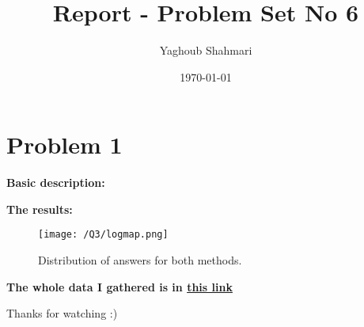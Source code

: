 \documentclass{article}
\author{Yaghoub Shahmari}
\title{Report - Problem Set No 6}
\date{\today}
\begin{document}
    \maketitle
    \section*{Problem 1}
    \textbf{Basic description:}

    \textbf{The results:}

    \begin{figure}[!htb]
        \centering
        \texttt{[image: /Q3/logmap.png]}
        \label{fig:1.1}
        \caption{Distribution of answers for both methods.}
    \end{figure}

    \pagebreak

    \centering
    \textbf{The whole data I gathered is in \href{https://github.com/shahmari/ComputationalPhysics-Fall2021/tree/main/ProblemSet7/Data}{this link}}

    Thanks for watching :)
\end{document}
